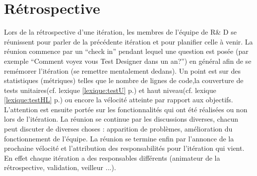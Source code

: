 \section{Rétrospective}
Lors de la rétrospective d'une itération, les membres de l'équipe de R\& D se réunissent pour parler de la précédente itération et pour planifier celle à venir. La réunion commence par un ``check in'' pendant lequel une question est posée (par exemple ``Comment voyez vous Test Designer dans un an?'') en général afin de se remémorer l'itération (se remettre mentalement dedans). Un point est sur des statistiques (métriques) telles que le nombre de lignes de code,la couverture de tests unitaires(cf. lexique \ref{lexique:testU} p.\pageref{lexique:testU}) et haut niveau(cf. lexique \ref{lexique:testHL} p.\pageref{lexique:testHL}) ou encore la vélocité atteinte par rapport aux objectifs. L'attention est ensuite portée sur les fonctionnalités qui ont été réalisées ou non lors de l'itération. La réunion se continue par les discussions diverses, chacun peut discuter de diverses choses : apparition de problèmes, amélioration du fonctionnement de l'équipe. La réunion se termine enfin par l'annonce de la prochaine vélocité et l'attribution des responsabilités pour l'itération qui vient. En effet chaque itération a des responsables différents (animateur de la rétrospective, validation, veilleur ...).
